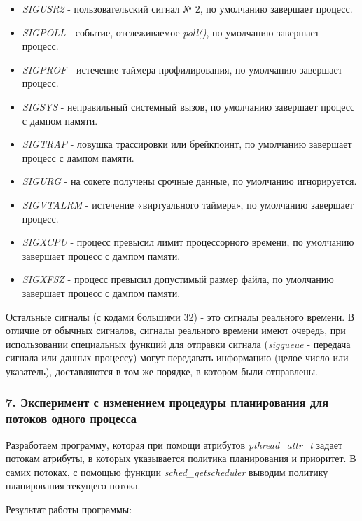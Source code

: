 \documentclass[14pt,a4paper,report]{report}
\begin{document}
\begin{itemize}
	\item \emph{SIGUSR2} - пользовательский сигнал № 2, по умолчанию завершает процесс.
	\item \emph{SIGPOLL} - событие, отслеживаемое \emph{poll()}, по умолчанию завершает процесс.	
	\item \emph{SIGPROF} - истечение таймера профилирования, по умолчанию завершает процесс.	
	\item \emph{SIGSYS} - неправильный системный вызов, по умолчанию завершает процесс с дампом памяти.	
	\item \emph{SIGTRAP} - ловушка трассировки или брейкпоинт, по умолчанию завершает процесс с дампом памяти.		
	\item \emph{SIGURG} - на сокете получены срочные данные, по умолчанию игнорируется.	
	\item \emph{SIGVTALRM} - истечение «виртуального таймера», по умолчанию завершает процесс.	
	\item \emph{SIGXCPU} - процесс превысил лимит процессорного времени, по умолчанию завершает процесс с дампом памяти.		
	\item \emph{SIGXFSZ} - процесс превысил допустимый размер файла, по умолчанию завершает процесс с дампом памяти.		
	
\end{itemize}

Остальные сигналы (с кодами большими 32) - это сигналы реального времени. В отличие от обычных сигналов, сигналы реального времени имеют очередь, при использовании специальных функций для отправки сигнала (\emph{sigqueue} - передача сигнала или данных процессу) могут передавать информацию (целое число или указатель), доставляются в том же порядке, в котором были отправлены.

\subsubsection{7. Эксперимент с изменением процедуры планирования для потоков одного процесса}

Разработаем программу, которая при помощи атрибутов \emph{pthread\_attr\_t} задает потокам атрибуты, в которых указывается политика планирования и приоритет. В самих потоках, с помощью функции  \emph{sched\_getscheduler} выводим политику планирования текущего потока.



Результат работы программы:


\end{document}
